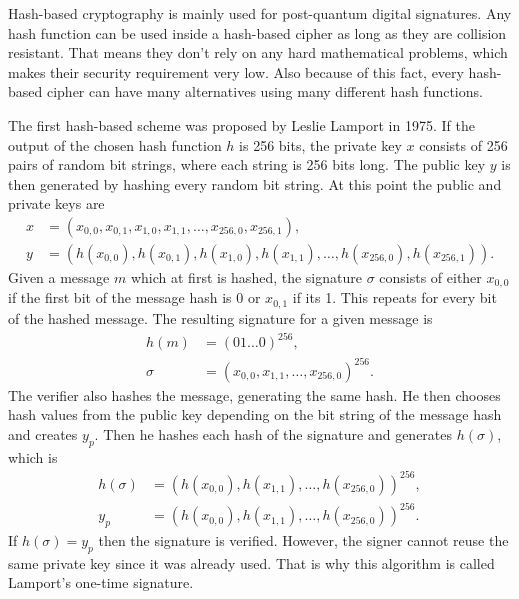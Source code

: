 Hash-based cryptography is mainly used for post-quantum digital signatures. Any hash function can be used inside a hash-based cipher as long as they are collision resistant. That means they don't rely on any hard mathematical problems, which makes their security requirement very low. Also because of this fact, every hash-based cipher can have many alternatives using many different hash functions. \cite{Bernstein2009}

The first hash-based scheme was proposed by Leslie Lamport in 1975. If the output of the chosen hash function $h$ is 256 bits, the private key $x$ consists of 256 pairs of random bit strings, where each string is 256 bits long. The public key $y$ is then generated by hashing every random bit string. At this point the public and private keys are
\begin{align}
  x & =(x_{0,0}, x_{0,1}, x_{1,0}, x_{1,1},\dots,x_{256, 0},x_{256, 1}),                   \\
  y & =(h(x_{0,0}), h(x_{0,1}), h(x_{1,0}), h(x_{1,1}),\dots,h(x_{256, 0}),h(x_{256, 1})).
\end{align}
Given a message $m$ which at first is hashed, the signature $\sigma$ consists of either $x_{0,0}$ if the first bit of the message hash is 0 or $x_{0,1}$ if its 1. This repeats for every bit of the hashed message. The resulting signature for a given message is
\begin{align}
  h(m)   & =(01\dots0)^{256},                           \\
  \sigma & =(x_{0,0}, x_{1,1}, \dots, x_{256,0})^{256}.
\end{align}
The verifier also hashes the message, generating the same hash. He then chooses hash values from the public key depending on the bit string of the message hash and creates $y_p$. Then he hashes each hash of the signature and generates $h(\sigma)$, which is
\begin{align}
  h(\sigma) & =(h(x_{0,0}), h(x_{1,1}), \dots, h(x_{256,0}))^{256}, \\
  y_p       & =(h(x_{0,0}), h(x_{1,1}), \dots, h(x_{256,0}))^{256}.
\end{align}
If $h(\sigma)=y_p$ then the signature is verified. However, the signer cannot reuse the same private key since it was already used. That is why this algorithm is called Lamport's one-time signature. \cite{Bernstein149}

